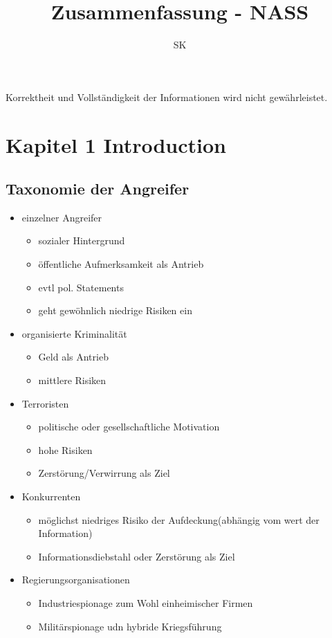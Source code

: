 \documentclass{article} %
\title{Zusammenfassung - NASS}
\author{
	SK
}
\begin{document}
\maketitle
\begin{framed}
	Korrektheit und Vollständigkeit der Informationen wird nicht gewährleistet.
\end{framed}
\setcounter{tocdepth}{1}
\tableofcontents

\chapter{Kapitel 1 Introduction}
\section{Taxonomie der Angreifer}
\begin{itemize}
	\item einzelner Angreifer
    
    \begin{itemize}
        \item sozialer Hintergrund
        \item öffentliche Aufmerksamkeit als Antrieb
        \item evtl pol. Statements
        \item geht gewöhnlich niedrige Risiken ein
    \end{itemize}
    \item organisierte Kriminalität
    
    \begin{itemize}
        \item Geld als Antrieb
        \item mittlere Risiken
    \end{itemize}
    \item Terroristen
    
    \begin{itemize}
        \item politische oder gesellschaftliche Motivation
        \item hohe Risiken
        \item Zerstörung/Verwirrung als Ziel
    \end{itemize}
    
    \item Konkurrenten
    
    
    \begin{itemize}
        \item möglichst niedriges Risiko der Aufdeckung(abhängig vom wert der Information)
        \item Informationsdiebstahl oder Zerstörung als Ziel
    \end{itemize}
    
    \item Regierungsorganisationen
    
    
    \begin{itemize}
        \item Industriespionage zum Wohl einheimischer Firmen
        \item Militärspionage udn hybride Kriegsführung
    \end{itemize}
\end{itemize}
\end{document}
